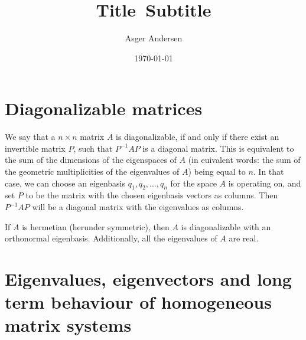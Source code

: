 \documentclass[12pt]{article}
\title{
  Title\
  \large Subtitle
}
\author{Asger Andersen}
\date{\today}
\begin{document}
\section{Diagonalizable matrices}

We say that a $n\times n$ matrix $A$ is diagonalizable, if and only if there exist an invertible matrix $P$, such that $P^{-1}AP$ is a diagonal matrix. This is equivalent to the sum of the dimensions of the eigenspaces of $A$ (in euivalent words: the sum of the geometric multiplicities of the eigenvalues of $A$) being equal to $n$. In that case, we can choose an eigenbasis $q_1,q_2,...,q_n$ for the space $A$ is operating on, and set $P$ to be the matrix with the chosen eigenbasis vectors as columns. Then $P^{-1}AP$ will be a diagonal matrix with the eigenvalues as columns.

If $A$ is hermetian (herunder symmetric), then $A$ is diagonalizable with an orthonormal eigenbasis. Additionally, all the eigenvalues of $A$ are real.

\section{Eigenvalues, eigenvectors and long term behaviour of homogeneous matrix systems}
\end{document}
